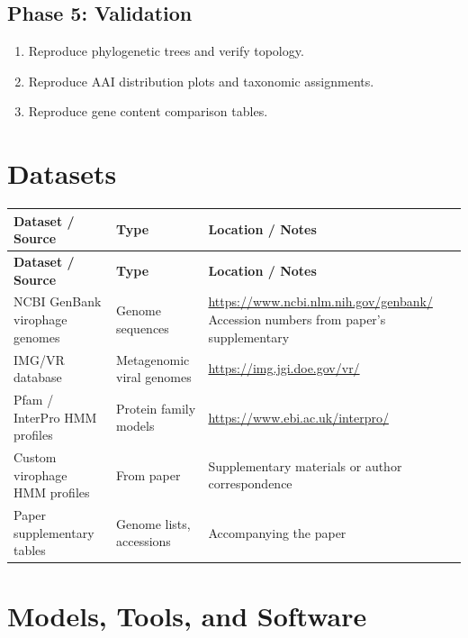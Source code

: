 \documentclass[11pt,a4paper]{article}
\begin{document}
\subsection{Phase 5: Validation}
\begin{enumerate}[label=\textbf{5.\arabic*}]
  \item Reproduce phylogenetic trees and verify topology.
  \item Reproduce AAI distribution plots and taxonomic assignments.
  \item Reproduce gene content comparison tables.
\end{enumerate}

\section{Datasets}

\begin{longtable}{p{4.5cm} p{3.5cm} p{6cm}}
\toprule
\textbf{Dataset / Source} & \textbf{Type} & \textbf{Location / Notes} \\
\midrule
\endfirsthead
\toprule
\textbf{Dataset / Source} & \textbf{Type} & \textbf{Location / Notes} \\
\midrule
\endhead
NCBI GenBank virophage genomes & Genome sequences & \url{https://www.ncbi.nlm.nih.gov/genbank/} \newline Accession numbers from paper's supplementary \\
\midrule
IMG/VR database & Metagenomic viral genomes & \url{https://img.jgi.doe.gov/vr/} \\
\midrule
Pfam / InterPro HMM profiles & Protein family models & \url{https://www.ebi.ac.uk/interpro/} \\
\midrule
Custom virophage HMM profiles & From paper & Supplementary materials or author correspondence \\
\midrule
Paper supplementary tables & Genome lists, accessions & Accompanying the paper \\
\bottomrule
\end{longtable}

\section{Models, Tools, and Software}
\end{document}
